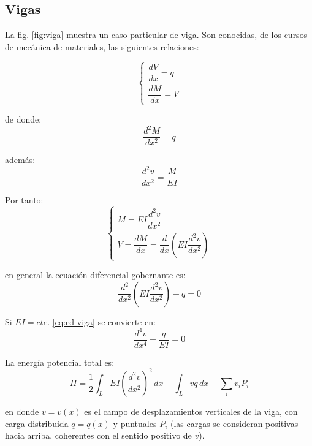 \subsection{Vigas}

La fig. \ref{fig:viga} muestra un caso particular de viga. Son conocidas, de los cursos de mecánica de materiales, las siguientes relaciones:

\begin{equation}
	\begin{cases}
		\dfrac{dV}{dx} = q\\[3mm]
		\dfrac{dM}{dx} = V
	\end{cases}
\end{equation}


de donde:
\[ \dfrac{d^2 M }{dx^2} = q \]

además:
\[ \dfrac{d^2 v}{dx^2} = \dfrac{M}{EI} \]

Por tanto:
\begin{equation}
	\begin{cases}
		M = EI \dfrac{d^2v}{dx^2} \\[3mm]
		V = \dfrac{dM}{dx} = \dfrac{d}{dx} \left( EI \dfrac{d^2v}{dx^2} \right)
	\end{cases}
\end{equation}

en general la ecuación diferencial gobernante es:
\begin{equation}
	\dfrac{d^2}{dx^2} \left( EI \dfrac{d^2v}{dx^2}\right) - q = 0
	\label{eq:ed-viga}
\end{equation}

Si $EI = cte.$ \eqref{eq:ed-viga} se convierte en:
\begin{equation}
	\dfrac{d^4v}{dx^4} - \dfrac{q}{EI} = 0
	\label{eq:ed-viga-cte}
\end{equation}

La energía potencial total es:
\begin{equation}
	\Pi = \frac{1}{2} \int_L EI \left(\frac{d^2v}{dx^2}\right)^2 \, dx - \int_L vq \, dx - \sum_i v_iP_i
	\label{eq:energia-vigas}
\end{equation}

en donde $v = v(x)$ es el campo de desplazamientos verticales de la viga, con carga 
distribuida $q = q(x)$ y puntuales $P_i$ (las cargas se consideran positivas hacia 
arriba, coherentes con el sentido positivo de $v$).

